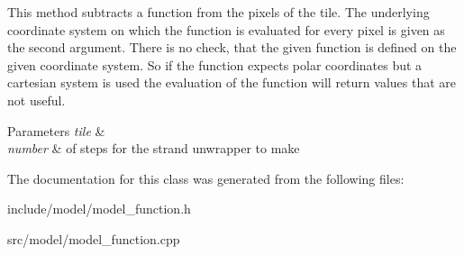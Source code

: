 This method subtracts a function from the pixels of the tile. The underlying coordinate system on which the function is evaluated for every pixel is given as the second argument. There is no check, that the given function is defined on the given coordinate system. So if the function expects polar coordinates but a cartesian system is used the evaluation of the function will return values that are not useful. 
\begin{DoxyParams}{Parameters}
{\em tile} & \\
\hline
{\em number} & of steps for the strand unwrapper to make \\
\hline
\end{DoxyParams}


The documentation for this class was generated from the following files\-:\begin{DoxyCompactItemize}
\item 
include/model/model\-\_\-function.\-h\item 
src/model/model\-\_\-function.\-cpp\end{DoxyCompactItemize}
